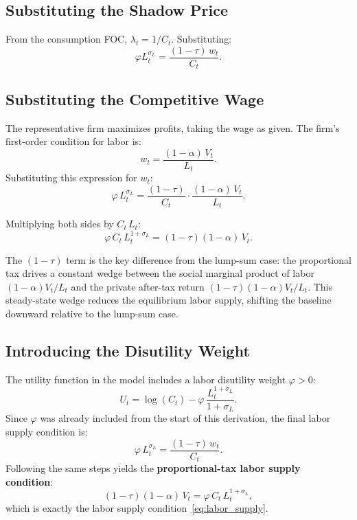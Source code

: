 	\subsection*{Substituting the Shadow Price}
	
	From the consumption FOC, $\lambda_t = 1/C_t$. Substituting:
	\begin{equation*}
		\varphi L_t^{\sigma_L} = \frac{(1-\tau)\, w_t}{C_t}.
	\end{equation*}
	
	\subsection*{Substituting the Competitive Wage}
	
	The representative firm maximizes profits, taking the wage as given. The firm's first-order condition for labor is:
	\begin{equation*}
		w_t = \frac{(1-\alpha)\,V_t}{L_t}.
	\end{equation*}
	Substituting this expression for $w_t$:
	\begin{equation*}
		\varphi\, L_t^{\sigma_L} = \frac{(1-\tau)}{C_t} \cdot \frac{(1-\alpha)\,V_t}{L_t}.
	\end{equation*}
	
	Multiplying both sides by $C_t \, L_t$:
	\begin{equation*}
		\varphi \, C_t \, L_t^{1+\sigma_L} = (1-\tau)(1-\alpha)\,V_t.
	\end{equation*}
	
	\noindent The $(1-\tau)$ term is the key difference from the lump-sum case: the proportional tax drives a constant wedge between the social marginal product of labor $(1-\alpha)V_t/L_t$ and the private after-tax return $(1-\tau)(1-\alpha)V_t/L_t$. This steady-state wedge reduces the equilibrium labor supply, shifting the baseline downward relative to the lump-sum case.
	
	\subsection*{Introducing the Disutility Weight}
	
	The utility function in the model includes a labor disutility weight $\varphi > 0$:
	\begin{equation*}
		U_t = \log(C_t) - \varphi\,\frac{L_t^{1+\sigma_L}}{1+\sigma_L}.
	\end{equation*}
	Since $\varphi$ was already included from the start of this derivation, the final labor supply condition is:
	\begin{equation*}
		\varphi\, L_t^{\sigma_L} = \frac{(1-\tau)\,w_t}{C_t}.
	\end{equation*}
	Following the same steps yields the \textbf{proportional-tax labor supply condition}:
	\begin{equation*}
		(1-\tau)(1-\alpha)\,V_t = \varphi\,C_t\,L_t^{1+\sigma_L},
	\end{equation*}
	which is exactly the labor supply condition~\eqref{eq:labor_supply}.
	
